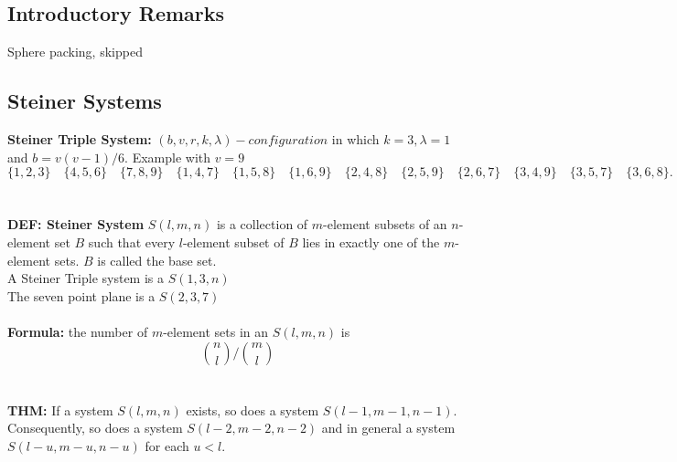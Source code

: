 \documentclass[12pt]{article}
\begin{document}
	\subsection{Introductory Remarks }
	Sphere packing, skipped
	\subsection{Steiner Systems }
	\textbf{Steiner Triple System: } $ (b,v,r,k,\lambda)-configuration $ in which $ k=3, \lambda=1 $ and $ b=v(v-1)/6 $. Example with $ v=9 $
	\[
		\{1,2,3\}\quad\{4,5,6\}\quad\{7,8,9\}\quad\{1,4,7\}\quad\{1,5,8\}\quad\{1,6,9\}\quad
		\{2,4,8\}\quad\{2,5,9\}\quad\{2,6,7\}\quad\{3,4,9\}\quad\{3,5,7\}\quad\{3,6,8\}.
	\]\\\\
	\textbf{DEF: Steiner System } $ S(l,m,n) $ is a collection of  $ m $-element  subsets of an  $ n $-element  set $ B $ such that every $ l $-element  subset of $ B $ lies in exactly one of the  $ m $-element  sets. $ B $ is called the base set. \\
	A Steiner Triple system is a $ S(1,3,n) $\\
	The seven point plane is a $ S(2,3,7) $\\\\
	\textbf{Formula: } the number of $ m $-element sets in an $ S(l,m,n) $ is 
	\[
		\binom{n}{l}/\binom{m}{l}
	\]\\\\
	\textbf{THM: }If a system $ S(l, m, n) $ exists, so does a system $ S(l -1,	m -	1, n -	1) $. Consequently, so does a system $ S(l -	2, m -	2, n -	2) $	and in general a system $ S(l -	u, m -	u, n -	u) $ for each $ u < l $.
\end{document}

